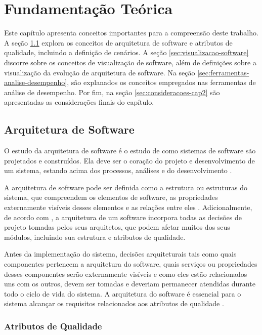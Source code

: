 \chapter{Fundamentação Teórica} \label{ch:fundamentacao-teorica}

Este capítulo apresenta conceitos importantes para a compreensão deste trabalho. A seção \ref{sec:arquitetura-software} explora os conceitos de arquitetura de software e atributos de qualidade, incluindo a definição de cenários. A seção \ref{sec:visualizacao-software} discorre sobre os conceitos de visualização de software, além de definições sobre a visualização da evolução de arquitetura de software. Na seção \ref{sec:ferramentas-analise-desempenho}, são explanados os conceitos empregados nas ferramentas de análise de desempenho. Por fim, na seção \ref{sec:consideracoes-cap2} são apresentadas as considerações finais do capítulo.

\section{Arquitetura de Software} \label{sec:arquitetura-software}

O estudo da arquitetura de software é o estudo de como sistemas de software são projetados e construídos. Ela deve ser o coração do projeto e desenvolvimento de um sistema, estando acima dos processos, análises e do desenvolvimento \cite{Taylor2009}.

A arquitetura de software pode ser definida como a estrutura ou estruturas do sistema, que compreendem os elementos de software, as propriedades externamente visíveis desses elementos e as relações entre eles \cite{Bass2007}. Adicionalmente, de acordo com \citeauthor{Taylor2009}, a arquitetura de um software incorpora todas as decisões de projeto tomadas pelos seus arquitetos, que podem afetar muitos dos seus módulos, incluindo sua estrutura e atributos de qualidade.

Antes da implementação do sistema, decisões arquiteturais tais como quais componentes pertencem a arquitetura do software, quais serviços ou propriedades desses componentes serão externamente visíveis e como eles estão relacionados uns com os outros, devem ser tomadas e deveriam permanecer atendidas durante todo o ciclo de vida do sistema. A arquitetura do software é essencial para o sistema alcançar os requisitos relacionados aos atributos de qualidade \cite{Kazman2001}.

\subsection{Atributos de Qualidade} \label{subsec:atributos-qualidade}

